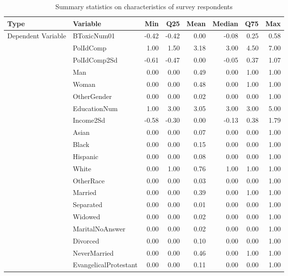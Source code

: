 \begin{table}[!h]
\centering
\caption{\label{tab:summ-tab-ind}Summary statistics on characteristics of survey respondents}
\centering
\begin{tabular}[t]{llrrrrrr}
\toprule
Type & Variable & Min & Q25 & Mean & Median & Q75 & Max\\
\midrule
Dependent Variable & BToxicNum01 & -0.42 & -0.42 & 0.00 & -0.08 & 0.25 & 0.58\\
\cmidrule{1-8}
 & PolIdComp & 1.00 & 1.50 & 3.18 & 3.00 & 4.50 & 7.00\\
\cmidrule{2-8}
 & PolIdComp2Sd & -0.61 & -0.47 & 0.00 & -0.05 & 0.37 & 1.07\\
\cmidrule{2-8}
 & Man & 0.00 & 0.00 & 0.49 & 0.00 & 1.00 & 1.00\\
\cmidrule{2-8}
 & Woman & 0.00 & 0.00 & 0.48 & 0.00 & 1.00 & 1.00\\
\cmidrule{2-8}
 & OtherGender & 0.00 & 0.00 & 0.02 & 0.00 & 0.00 & 1.00\\
\cmidrule{2-8}
 & EducationNum & 1.00 & 3.00 & 3.05 & 3.00 & 3.00 & 5.00\\
\cmidrule{2-8}
 & Income2Sd & -0.58 & -0.30 & 0.00 & -0.13 & 0.38 & 1.79\\
\cmidrule{2-8}
 & Asian & 0.00 & 0.00 & 0.07 & 0.00 & 0.00 & 1.00\\
\cmidrule{2-8}
 & Black & 0.00 & 0.00 & 0.15 & 0.00 & 0.00 & 1.00\\
\cmidrule{2-8}
 & Hispanic & 0.00 & 0.00 & 0.08 & 0.00 & 0.00 & 1.00\\
\cmidrule{2-8}
 & White & 0.00 & 1.00 & 0.76 & 1.00 & 1.00 & 1.00\\
\cmidrule{2-8}
 & OtherRace & 0.00 & 0.00 & 0.03 & 0.00 & 0.00 & 1.00\\
\cmidrule{2-8}
 & Married & 0.00 & 0.00 & 0.39 & 0.00 & 1.00 & 1.00\\
\cmidrule{2-8}
 & Separated & 0.00 & 0.00 & 0.01 & 0.00 & 0.00 & 1.00\\
\cmidrule{2-8}
 & Widowed & 0.00 & 0.00 & 0.02 & 0.00 & 0.00 & 1.00\\
\cmidrule{2-8}
 & MaritalNoAnswer & 0.00 & 0.00 & 0.02 & 0.00 & 0.00 & 1.00\\
\cmidrule{2-8}
 & Divorced & 0.00 & 0.00 & 0.10 & 0.00 & 0.00 & 1.00\\
\cmidrule{2-8}
 & NeverMarried & 0.00 & 0.00 & 0.46 & 0.00 & 1.00 & 1.00\\
\cmidrule{2-8}
 & EvangelicalProtestant & 0.00 & 0.00 & 0.11 & 0.00 & 0.00 & 1.00\\

\end{tabular}
\end{table}
